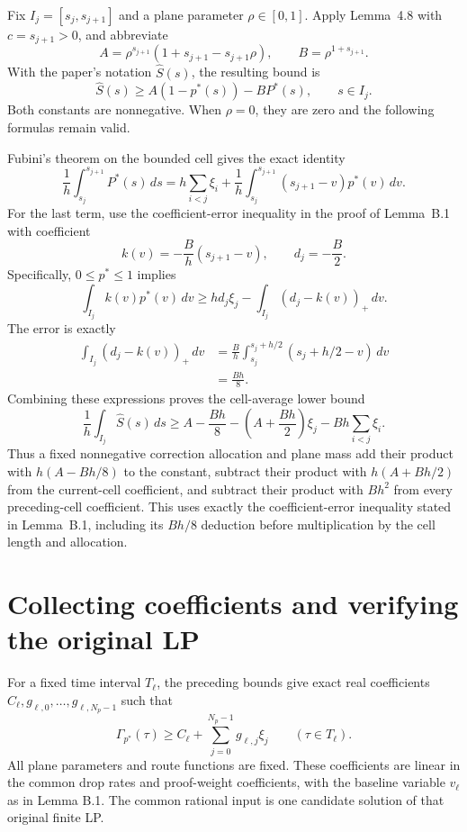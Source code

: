 \documentclass[11pt,a4paper]{article}
\begin{document}
Fix $I_j=[s_j,s_{j+1}]$ and a plane parameter $\rho\in[0,1]$.
Apply Lemma~4.8 with $c=s_{j+1}>0$, and abbreviate
\[
 A=\rho^{s_{j+1}}(1+s_{j+1}-s_{j+1}\rho),
 \qquad B=\rho^{1+s_{j+1}}.
\]
With the paper's notation $\widehat S(s)$, the resulting bound is
\[
 \widehat S(s)\ge A(1-p^*(s))-B P^*(s),
 \qquad s\in I_j.
\]
Both constants are nonnegative.  When $\rho=0$, they are zero and
the following formulas remain valid.

Fubini's theorem on the bounded cell gives the exact identity
\[
 \frac1h\int_{s_j}^{s_{j+1}}P^*(s)\,ds
 =h\sum_{i<j}\xi_i
   +\frac1h\int_{s_j}^{s_{j+1}}(s_{j+1}-v)p^*(v)\,dv.
\]
For the last term, use the coefficient-error inequality in the
proof of Lemma~B.1 with coefficient
\[
 k(v)=-\frac{B}{h}(s_{j+1}-v),
 \qquad d_j=-\frac B2.
\]
Specifically, $0\le p^*\le1$ implies
\[
 \int_{I_j}k(v)p^*(v)\,dv
 \ge h d_j\xi_j-\int_{I_j}(d_j-k(v))_+\,dv.
\]
The error is exactly
\[
\begin{aligned}
 \int_{I_j}(d_j-k(v))_+\,dv
 &=\frac{B}{h}
   \int_{s_j}^{s_j+h/2}(s_j+h/2-v)\,dv\\
 &=\frac{Bh}{8}.
\end{aligned}
\]
Combining these expressions proves the cell-average lower bound
\[
 \boxed{
 \frac1h\int_{I_j}\widehat S(s)\,ds
 \ge A-\frac{Bh}{8}
       -\left(A+\frac{Bh}{2}\right)\xi_j
       -Bh\sum_{i<j}\xi_i.}
\]
Thus a fixed nonnegative correction allocation and plane mass add
their product with $h(A-Bh/8)$ to the constant, subtract their product
with $h(A+Bh/2)$ from the current-cell coefficient, and subtract
their product with $Bh^2$ from every preceding-cell coefficient.
This uses exactly the coefficient-error inequality stated in
Lemma~B.1, including its $Bh/8$ deduction before multiplication by
the cell length and allocation.

\section{Collecting coefficients and verifying the original LP}\label{sec:suffix}
For a fixed time interval $T_\ell$, the preceding bounds give exact real
coefficients $C_\ell,g_{\ell,0},\ldots,g_{\ell,N_p-1}$ such that
\begin{equation}\label{eq:affine}
 \Gamma_{p^*}(\tau)\ge C_\ell+\sum_{j=0}^{N_p-1}g_{\ell,j}\xi_j
 \qquad(\tau\in T_\ell).
\end{equation}
All plane parameters and route functions are fixed. These coefficients are
linear in the common drop rates and proof-weight coefficients, with the
baseline variable $v_\ell$ as in Lemma B.1. The common rational input is
one candidate solution of that original finite LP.
\end{document}
